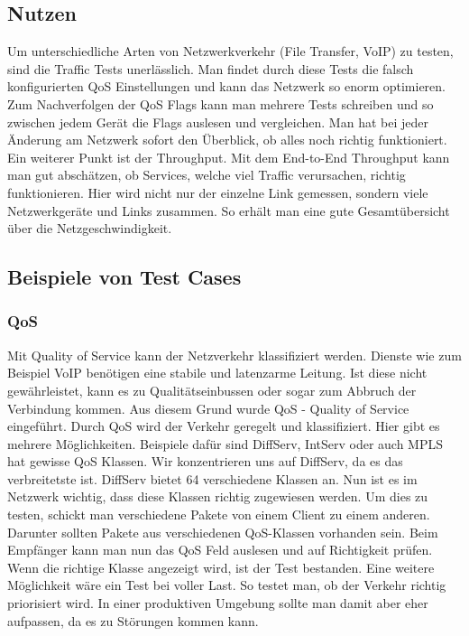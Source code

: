 \documentclass[a4,12pt]{scrartcl}
\begin{document}
\subsection{Nutzen}
Um unterschiedliche Arten von Netzwerkverkehr (File Transfer, VoIP) zu testen, sind die Traffic Tests unerlässlich. Man findet durch diese Tests die falsch konfigurierten QoS Einstellungen und kann das Netzwerk so enorm optimieren. \newline
Zum Nachverfolgen der QoS Flags kann man mehrere Tests schreiben und so zwischen jedem Gerät die Flags auslesen und vergleichen.\newline\newline\newline
Man hat bei jeder Änderung am Netzwerk sofort den Überblick, ob alles noch richtig funktioniert.\newline\newline
Ein weiterer Punkt ist der Throughput. Mit dem End-to-End Throughput kann man gut abschätzen, ob Services, welche viel Traffic verursachen, richtig funktionieren. Hier wird nicht nur der einzelne Link gemessen, sondern viele Netzwerkgeräte und Links zusammen. So erhält man eine gute Gesamtübersicht über die Netzgeschwindigkeit.

\subsection{Beispiele von Test Cases}
\subsubsection{QoS}
Mit Quality of Service kann der Netzverkehr klassifiziert werden. Dienste wie zum Beispiel VoIP benötigen eine stabile und latenzarme Leitung. Ist diese nicht gewährleistet, kann es zu Qualitätseinbussen oder sogar zum Abbruch der Verbindung kommen. Aus diesem Grund wurde QoS - Quality of Service eingeführt. Durch QoS wird der Verkehr geregelt und klassifiziert. Hier gibt es mehrere Möglichkeiten. Beispiele dafür sind DiffServ, IntServ oder auch MPLS hat gewisse QoS Klassen. Wir konzentrieren uns auf DiffServ, da es das verbreitetste ist.\newline\newline
DiffServ bietet 64 verschiedene Klassen an. Nun ist es im Netzwerk wichtig, dass diese Klassen richtig zugewiesen werden. Um dies zu testen, schickt man verschiedene Pakete von einem Client zu einem anderen. Darunter sollten Pakete aus verschiedenen QoS-Klassen vorhanden sein. Beim Empfänger kann man nun das QoS Feld auslesen und auf Richtigkeit prüfen. Wenn die richtige Klasse angezeigt wird, ist der Test bestanden.\newline\newline
Eine weitere Möglichkeit wäre ein Test bei voller Last. So testet man, ob der Verkehr richtig priorisiert wird. In einer produktiven Umgebung sollte man damit aber eher aufpassen, da es zu Störungen kommen kann.
\end{document}
